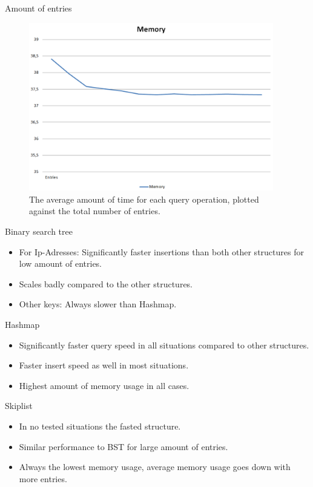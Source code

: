 \documentclass[10pt]{beamer}
\begin{document}
\begin{frame}{Amount of entries}
    \begin{figure}
      \centering
        \includegraphics[width=0.95\textwidth]{SkiplistMemory}
      \caption{The average amount of time for each query operation, plotted against the total number of entries.}
    \end{figure}
\end{frame}

\begin{frame}{Binary search tree}
    \begin{itemize}
        \item For Ip-Adresses: Significantly faster insertions than both other structures for low amount of entries.
        \item Scales badly compared to the other structures.
        \item Other keys: Always slower than Hashmap.
    \end{itemize}       
\end{frame}

\begin{frame}{Hashmap}
    \begin{itemize}
        \item Significantly faster query speed in all situations compared to other structures.
        \item Faster insert speed as well in most situations.
        \item Highest amount of memory usage in all cases.
    \end{itemize}       
\end{frame}

\begin{frame}{Skiplist}
    \begin{itemize}
        \item In no tested situations the fasted structure.
        \item Similar performance to BST for large amount of entries.
        \item Always the lowest memory usage, average memory usage goes down with more entries.
    \end{itemize}       
\end{frame}
\end{document}
